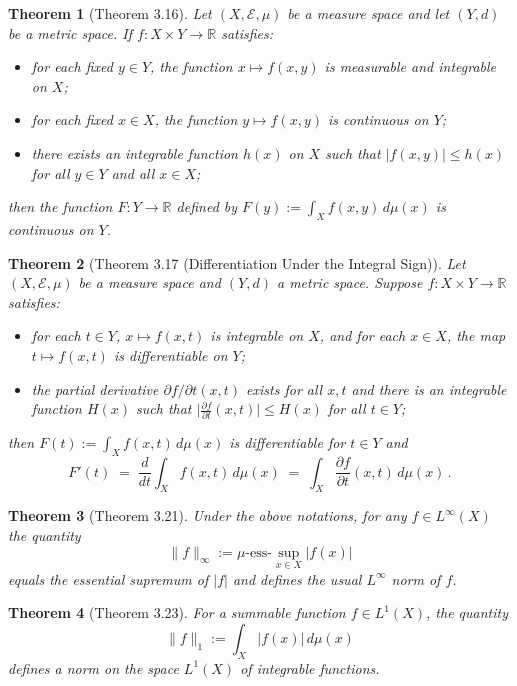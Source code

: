 \documentclass{article}
\theoremstyle{plain}
\newtheorem*{theorem*}{Theorem}
\begin{document}
\begin{theorem*}[Theorem 3.16]
Let $(X, \mathcal{E}, \mu)$ be a measure space and let $(Y,d)$ be a metric space. If $f: X \times Y \to \mathbb{R}$ satisfies:
\begin{itemize}
\item for each fixed $y\in Y$, the function $x \mapsto f(x,y)$ is measurable and integrable on $X$;
\item for each fixed $x\in X$, the function $y \mapsto f(x,y)$ is continuous on $Y$;
\item there exists an integrable function $h(x)$ on $X$ such that $|f(x,y)| \le h(x)$ for all $y \in Y$ and all $x \in X$;
\end{itemize}
then the function $F: Y \to \mathbb{R}$ defined by $F(y) := \int_X f(x,y)\,d\mu(x)$ is continuous on $Y$.
\end{theorem*}

\begin{theorem*}[Theorem 3.17 (Differentiation Under the Integral Sign)]
Let $(X, \mathcal{E}, \mu)$ be a measure space and $(Y,d)$ a metric space. Suppose $f: X \times Y \to \mathbb{R}$ satisfies:
\begin{itemize}
\item for each $t \in Y$, $x \mapsto f(x,t)$ is integrable on $X$, and for each $x\in X$, the map $t \mapsto f(x,t)$ is differentiable on $Y$;
\item the partial derivative $\partial f/\partial t(x,t)$ exists for all $x,t$ and there is an integrable function $H(x)$ such that $\big|\frac{\partial f}{\partial t}(x,t)\big| \le H(x)$ for all $t\in Y$;
\end{itemize}
then $F(t) := \int_X f(x,t)\,d\mu(x)$ is differentiable for $t\in Y$ and 
\[
F'(t) \;=\; \frac{d}{dt}\int_X f(x,t)\,d\mu(x) \;=\; \int_X \frac{\partial f}{\partial t}(x,t)\,d\mu(x)\,.
\]
\end{theorem*}

\begin{theorem*}[Theorem 3.21]
Under the above notations, for any $f \in L^{\infty}(X)$ the quantity 
\[
\|f\|_{\infty} := \mu\text{-ess-}\sup_{x\in X} |f(x)| 
\] 
equals the essential supremum of $|f|$ and defines the usual $L^\infty$ norm of $f$.
\end{theorem*}

\begin{theorem*}[Theorem 3.23]
For a summable function $f \in L^1(X)$, the quantity 
\[
\|f\|_{1} := \int_X |f(x)|\,d\mu(x)
\] 
defines a norm on the space $L^1(X)$ of integrable functions.
\end{theorem*}
\end{document}
